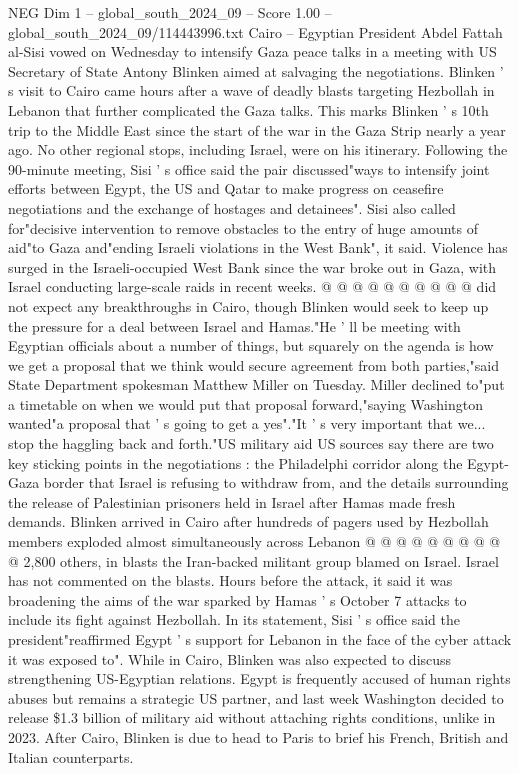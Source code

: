 \begin{textsample}{NEG Dim 1 – global\_south\_2024\_09 – Score 1.00 – global\_south\_2024\_09/114443996.txt}  \label{ex:f1_neg_240}
Cairo -- Egyptian President Abdel Fattah al-Sisi vowed on Wednesday to intensify Gaza peace talks in a meeting with US Secretary of State Antony Blinken aimed at salvaging the negotiations.
Blinken ' s visit to Cairo came hours after a wave of deadly blasts targeting Hezbollah in Lebanon that further complicated the Gaza talks.
This marks Blinken ' s 10th trip to the Middle East since the start of the war in the Gaza Strip nearly a year ago.
No other regional stops, including Israel, were on his itinerary.
Following the 90-minute meeting, Sisi ' s office said the pair discussed"ways to intensify joint efforts between Egypt, the US and Qatar to make progress on ceasefire negotiations and the exchange of hostages and detainees".
Sisi also called for"decisive intervention to remove obstacles to the entry of huge amounts of aid"to Gaza and"ending Israeli violations in the West Bank", it said.
Violence has surged in the Israeli-occupied West Bank since the war broke out in Gaza, with Israel conducting large-scale raids in recent weeks. @ @ @ @ @ @ @ @ @ @ did not expect any breakthroughs in Cairo, though Blinken would seek to keep up the pressure for a deal between Israel and Hamas."He ' ll be meeting with Egyptian officials about a number of things, but squarely on the agenda is how we get a proposal that we think would secure agreement from both parties,"said State Department spokesman Matthew Miller on Tuesday.
Miller declined to"put a timetable on when we would put that proposal forward,"saying Washington wanted"a proposal that ' s going to get a yes"."It ' s very important that we... stop the haggling back and forth."US military aid US sources say there are two key sticking points in the negotiations : the Philadelphi corridor along the Egypt-Gaza border that Israel is refusing to withdraw from, and the details surrounding the release of Palestinian prisoners held in Israel after Hamas made fresh demands.
Blinken arrived in Cairo after hundreds of pagers used by Hezbollah members exploded almost simultaneously across Lebanon @ @ @ @ @ @ @ @ @ @ 2,800 others, in blasts the Iran-backed militant group blamed on Israel.
Israel has not commented on the blasts.
Hours before the attack, it said it was broadening the aims of the war sparked by Hamas ' s October 7 attacks to include its fight against Hezbollah.
In its statement, Sisi ' s office said the president"reaffirmed Egypt ' s support for Lebanon in the face of the cyber attack it was exposed to".
While in Cairo, Blinken was also expected to discuss strengthening US-Egyptian relations.
Egypt is frequently accused of human rights abuses but remains a strategic US partner, and last week Washington decided to release \$1.3 billion of military aid without attaching rights conditions, unlike in 2023.
After Cairo, Blinken is due to head to Paris to brief his French, British and Italian counterparts.

\end{textsample}
